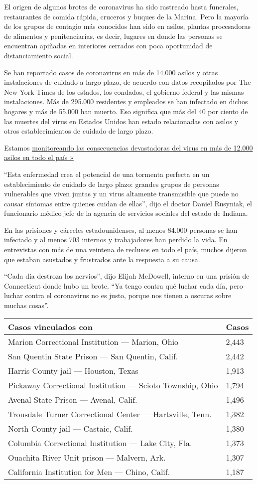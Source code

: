 El origen de algunos brotes de coronavirus ha sido rastreado hasta
funerales, restaurantes de comida rápida, cruceros y buques de la
Marina. Pero la mayoría de los grupos de contagio más conocidos han sido
en asilos, plantas procesadoras de alimentos y penitenciarías, es decir,
lugares en donde las personas se encuentran apiñadas en interiores
cerrados con poca oportunidad de distanciamiento social.

Se han reportado casos de coronavirus en más de 14.000 asilos y otras
instalaciones de cuidado a largo plazo, de acuerdo con datos recopilados
por The New York Times de los estados, los condados, el gobierno federal
y las mismas instalaciones. Más de 295.000 residentes y empleados se han
infectado en dichos hogares y más de 55.000 han muerto. Eso significa
que más del 40 por ciento de las muertes del virus en Estados Unidos han
estado relacionadas con asilos y otros establecimientos de cuidado de
largo plazo.

Estamos
\href{https://www.nytimes3xbfgragh.onion/interactive/2020/us/coronavirus-nursing-homes.html}{monitoreando
las consecuencias devastadoras del virus en más de 12.000 asilos en todo
el país »}

``Esta enfermedad crea el potencial de una tormenta perfecta en un
establecimiento de cuidado de largo plazo: grandes grupos de personas
vulnerables que viven juntas y un virus altamente transmisible que puede
no causar síntomas entre quienes cuidan de ellas'', dijo el doctor
Daniel Rusyniak, el funcionario médico jefe de la agencia de servicios
sociales del estado de Indiana.

En las prisiones y cárceles estadounidenses, al menos 84.000 personas se
han infectado y al menos 703 internos y trabajadores han perdido la
vida. En entrevistas con más de una veintena de reclusos en todo el
país, muchos dijeron que estaban asustados y frustrados ante la
respuesta a su causa.

``Cada día destroza los nervios'', dijo Elijah McDowell, interno en una
prisión de Connecticut donde hubo un brote. ``Ya tengo contra qué luchar
cada día, pero luchar contra el coronavirus no es justo, porque nos
tienen a oscuras sobre muchas cosas''.

\begin{longtable}[]{@{}ll@{}}
\toprule
Casos vinculados con & Casos\tabularnewline
\midrule
\endhead
Marion Correctional Institution --- Marion, Ohio & 2,443 \tabularnewline
San Quentin State Prison --- San Quentin, Calif. & 2,442 \tabularnewline
Harris County jail --- Houston, Texas & 1,913 \tabularnewline
Pickaway Correctional Institution --- Scioto Township, Ohio & 1,794
\tabularnewline
Avenal State Prison --- Avenal, Calif. & 1,496 \tabularnewline
Trousdale Turner Correctional Center --- Hartsville, Tenn. & 1,382
\tabularnewline
North County jail --- Castaic, Calif. & 1,380 \tabularnewline
Columbia Correctional Institution --- Lake City, Fla. & 1,373
\tabularnewline
Ouachita River Unit prison --- Malvern, Ark. & 1,307 \tabularnewline
California Institution for Men --- Chino, Calif. & 1,187 \tabularnewline
\bottomrule
\end{longtable}

